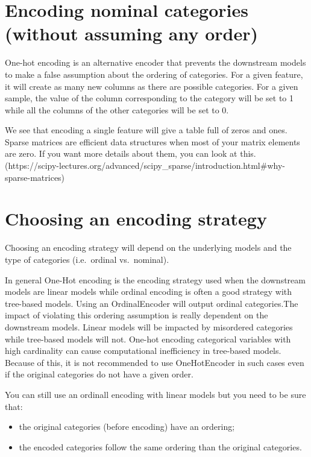 \documentclass[
  letterpaper,
  DIV=11,
  numbers=noendperiod,
  oneside]{scrreprt}
\providecommand{\tightlist}{%
  \setlength{\itemsep}{0pt}\setlength{\parskip}{0pt}}\usepackage{longtable,booktabs,array}
\begin{document}
\hypertarget{encoding-nominal-categories-without-assuming-any-order}{%
\section{Encoding nominal categories (without assuming any
order)}\label{encoding-nominal-categories-without-assuming-any-order}}

One-hot encoding is an alternative encoder that prevents the downstream
models to make a false assumption about the ordering of categories. For
a given feature, it will create as many new columns as there are
possible categories. For a given sample, the value of the column
corresponding to the category will be set to 1 while all the columns of
the other categories will be set to 0.

We see that encoding a single feature will give a table full of zeros
and ones. Sparse matrices are efficient data structures when most of
your matrix elements are zero. If you want more details about them, you
can look at this.
(https://scipy-lectures.org/advanced/scipy\_sparse/introduction.html\#why-sparse-matrices)

\hypertarget{choosing-an-encoding-strategy}{%
\section{Choosing an encoding
strategy}\label{choosing-an-encoding-strategy}}

Choosing an encoding strategy will depend on the underlying models and
the type of categories (i.e.~ordinal vs.~nominal).

In general One-Hot encoding is the encoding strategy used when the
downstream models are linear models while ordinal encoding is often a
good strategy with tree-based models. Using an OrdinalEncoder will
output ordinal categories.The impact of violating this ordering
assumption is really dependent on the downstream models. Linear models
will be impacted by misordered categories while tree-based models will
not. One-hot encoding categorical variables with high cardinality can
cause computational inefficiency in tree-based models. Because of this,
it is not recommended to use OneHotEncoder in such cases even if the
original categories do not have a given order.

You can still use an ordinall encoding with linear models but you need
to be sure that:

\begin{itemize}
\tightlist
\item
  the original categories (before encoding) have an ordering;
\item
  the encoded categories follow the same ordering than the original
  categories.
\end{itemize}
\end{document}
